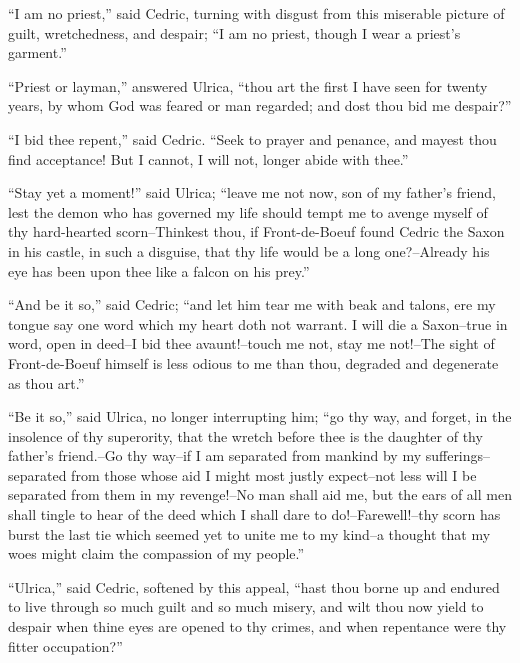 ``I am no priest,'' said Cedric, turning with disgust from this
miserable picture of guilt, wretchedness, and despair; ``I am no priest,
though I wear a priest's garment.''

``Priest or layman,'' answered Ulrica, ``thou art the first I have seen
for twenty years, by whom God was feared or man regarded; and dost thou
bid me despair?''

``I bid thee repent,'' said Cedric. ``Seek to prayer and penance, and
mayest thou find acceptance! But I cannot, I will not, longer abide with
thee.''

``Stay yet a moment!'' said Ulrica; ``leave me not now, son of my
father's friend, lest the demon who has governed my life should tempt me
to avenge myself of thy hard-hearted scorn--Thinkest thou, if
Front-de-Boeuf found Cedric the Saxon in his castle, in such a disguise,
that thy life would be a long one?--Already his eye has been upon thee
like a falcon on his prey.''

``And be it so,'' said Cedric; ``and let him tear me with beak and
talons, ere my tongue say one word which my heart doth not warrant. I
will die a Saxon--true in word, open in deed--I bid thee avaunt!--touch
me not, stay me not!--The sight of Front-de-Boeuf himself is less odious
to me than thou, degraded and degenerate as thou art.''

``Be it so,'' said Ulrica, no longer interrupting him; ``go thy way, and
forget, in the insolence of thy superority, that the wretch before thee
is the daughter of thy father's friend.--Go thy way--if I am separated
from mankind by my sufferings--separated from those whose aid I might
most justly expect--not less will I be separated from them in my
revenge!--No man shall aid me, but the ears of all men shall tingle to
hear of the deed which I shall dare to do!--Farewell!--thy scorn has
burst the last tie which seemed yet to unite me to my kind--a thought
that my woes might claim the compassion of my people.''

``Ulrica,'' said Cedric, softened by this appeal, ``hast thou borne up
and endured to live through so much guilt and so much misery, and wilt
thou now yield to despair when thine eyes are opened to thy crimes, and
when repentance were thy fitter occupation?''

